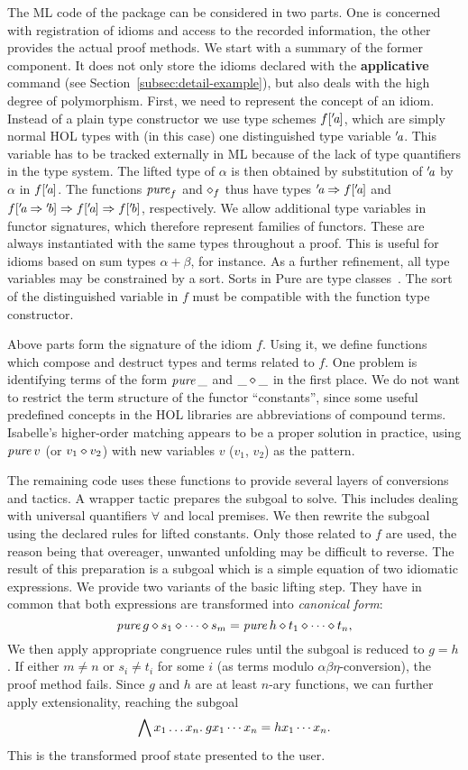 The ML code of the package can be considered in two parts.
One is concerned with registration of idioms and access to the recorded
information, the other provides the actual proof methods.
We start with a summary of the former component.
It does not only store the idioms declared with the \textbf{applicative}
command (see Section~\ref{subsec:detail-example}), but also deals with the high
degree of polymorphism.
First, we need to represent the concept of an idiom.
Instead of a plain type constructor we use type schemes $f[{'\!\textit{a}}]$, which
are simply normal HOL types with (in this case) one distinguished type variable
${'\!\textit{a}}$.
This variable has to be tracked externally in ML because of the lack of
type quantifiers in the type system.
The lifted type of $\alpha$ is then obtained by substitution of ${'\!\textit{a}}$ by
$\alpha$ in $f[{'\!\textit{a}}]$.
The functions $\operatorname{\mathit{pure}}_f$ and $\diamond_f$ thus have types
${'\!\textit{a}} \Rightarrow f[{'\!\textit{a}}]$ and $f[{'\!\textit{a}} \Rightarrow {'\!\textit{b}}] \Rightarrow f[{'\!\textit{a}}] \Rightarrow f[{'\!\textit{b}}]$,
respectively.
We allow additional type variables in functor signatures, which therefore
represent families of functors.
These are always instantiated with the same types throughout a proof.
This is useful for idioms based on sum types $\alpha + \beta$, for instance.
As a further refinement, all type variables may be constrained by a sort.
Sorts in Pure are type classes~\cite{implementation-ref}.
The sort of the distinguished variable in $f$ must be compatible with the
function type constructor.

Above parts form the signature of the idiom $f$.
Using it, we define functions which compose and destruct types and terms
related to $f$.
One problem is identifying terms of the form $\operatorname{\mathit{pure}} \_$ and $\_ \diamond \_$ in
the first place.
We do not want to restrict the term structure of the functor ``constants'',
since some useful predefined concepts in the HOL libraries are abbreviations of
compound terms.
Isabelle's higher-order matching appears to be a proper solution in practice,
using $\operatorname{\mathit{pure}} v$ (or $v_1 \diamond v_2$) with new variables $v$ ($v_1$, $v_2$) as the
pattern.

The remaining code uses these functions to provide several layers of
conversions and tactics.
A wrapper tactic prepares the subgoal to solve.
This includes dealing with universal quantifiers $\forall$ and local premises.
We then rewrite the subgoal using the declared rules for lifted constants.
Only those related to $f$ are used, the reason being that overeager, unwanted
unfolding may be difficult to reverse.
The result of this preparation is a subgoal which is a simple equation of two
idiomatic expressions.
We provide two variants of the basic lifting step.
They have in common that both expressions are transformed into \emph{canonical form}:
\[ \operatorname{\mathit{pure}}{g} \diamond s_1 \diamond \cdots \diamond s_m = \operatorname{\mathit{pure}}{h} \diamond t_1 \diamond \cdots \diamond t_n, \]
We then apply appropriate congruence rules until the subgoal is reduced to $g = h$.
If either $m \ne n$ or $s_i \ne t_i$ for some $i$ (as terms modulo
$\alpha\beta\eta$-conversion), the proof method fails.
Since $g$ and $h$ are at least $n$-ary functions, we can further apply
extensionality, reaching the subgoal
\[ \bigwedge x_1 \dots x_n.\>g x_1 \cdots x_n = h x_1 \cdots x_n. \]
This is the transformed proof state presented to the user.

